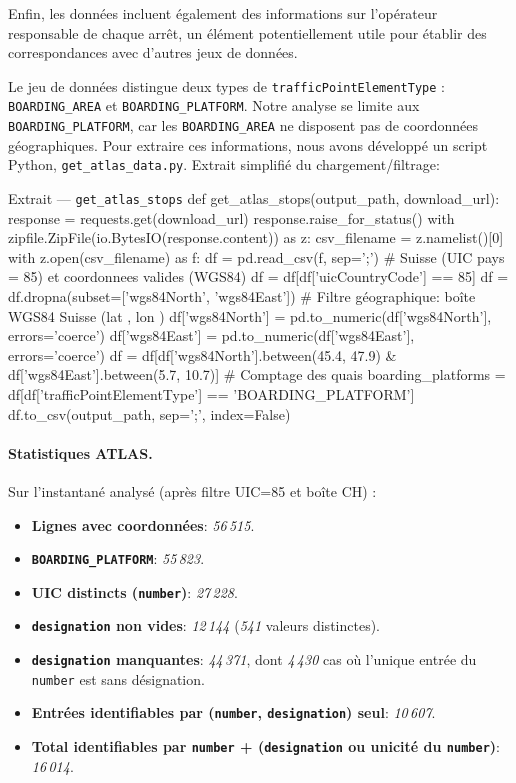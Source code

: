 Enfin, les données incluent également des informations sur l’opérateur responsable de chaque arrêt, un élément potentiellement utile pour établir des correspondances avec d’autres jeux de données.

Le jeu de données distingue deux types de \texttt{trafficPointElementType} : \texttt{BOARDING\_AREA} et \texttt{BOARDING\_PLATFORM}. Notre analyse se limite aux \texttt{BOARDING\_PLATFORM}, car les \texttt{BOARDING\_AREA} ne disposent pas de coordonnées géographiques. Pour extraire ces informations, nous avons développé un script Python, \texttt{get\_atlas\_data.py}. Extrait simplifié du chargement/filtrage:

\begin{codebox}[language=Python]{Extrait — \texttt{get\_atlas\_stops}}
def get_atlas_stops(output_path, download_url):
    response = requests.get(download_url)
    response.raise_for_status()
    with zipfile.ZipFile(io.BytesIO(response.content)) as z:
        csv_filename = z.namelist()[0]
        with z.open(csv_filename) as f:
            df = pd.read_csv(f, sep=';')
            # Suisse (UIC pays = 85) et coordonnees valides (WGS84)
            df = df[df['uicCountryCode'] == 85]
            df = df.dropna(subset=['wgs84North', 'wgs84East'])
            # Filtre géographique: boîte WGS84 Suisse (lat \in [45.4, 47.9], lon \in [5.7, 10.7])
            df['wgs84North'] = pd.to_numeric(df['wgs84North'], errors='coerce')
            df['wgs84East'] = pd.to_numeric(df['wgs84East'], errors='coerce')
            df = df[df['wgs84North'].between(45.4, 47.9) & df['wgs84East'].between(5.7, 10.7)]
            # Comptage des quais
            boarding_platforms = df[df['trafficPointElementType'] == 'BOARDING_PLATFORM']
            df.to_csv(output_path, sep=';', index=False)
\end{codebox}



\paragraph{Statistiques ATLAS.} Sur l'instantané analysé (après filtre UIC=85 et boîte CH) :
\begin{itemize}
  \item \textbf{Lignes avec coordonnées}: \textit{56\,515}.
  \item \textbf{\texttt{BOARDING\_PLATFORM}}: \textit{55\,823}.
  \item \textbf{UIC distincts (\texttt{number})}: \textit{27\,228}.
  \item \textbf{\texttt{designation} non vides}: \textit{12\,144} (\textit{541} valeurs distinctes).
  \item \textbf{\texttt{designation} manquantes}: \textit{44\,371}, dont \textit{4\,430} cas où l'unique entrée du \texttt{number} est sans désignation.
  \item \textbf{Entrées identifiables par (\texttt{number}, \texttt{designation}) seul}: \textit{10\,607}.
  \item \textbf{Total identifiables par \texttt{number} + (\texttt{designation} ou unicité du \texttt{number})}: \textit{16\,014}.
\end{itemize}


